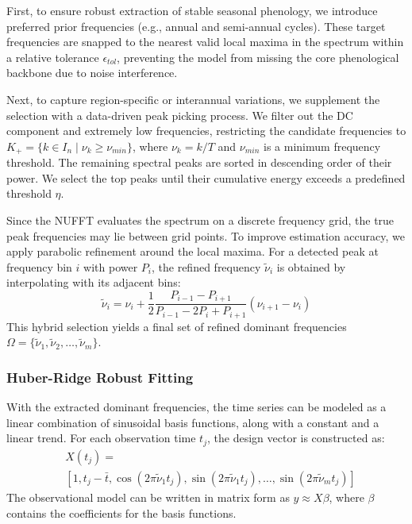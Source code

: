 \documentclass[letterpaper,journal]{IEEEtran}
\begin{document}
First, to ensure robust extraction of stable seasonal phenology, we introduce preferred prior frequencies (e.g., annual and semi-annual cycles). These target frequencies are snapped to the nearest valid local maxima in the spectrum within a relative tolerance $\epsilon_{tol}$, preventing the model from missing the core phenological backbone due to noise interference.

Next, to capture region-specific or interannual variations, we supplement the selection with a data-driven peak picking process. We filter out the DC component and extremely low frequencies, restricting the candidate frequencies to $K_+ = \{k \in I_n \mid \nu_k \ge \nu_{min}\}$, where $\nu_k = k/T$ and $\nu_{min}$ is a minimum frequency threshold. The remaining spectral peaks are sorted in descending order of their power. We select the top peaks until their cumulative energy exceeds a predefined threshold $\eta$.

Since the NUFFT evaluates the spectrum on a discrete frequency grid, the true peak frequencies may lie between grid points. To improve estimation accuracy, we apply parabolic refinement around the local maxima. For a detected peak at frequency bin $i$ with power $P_i$, the refined frequency $\tilde{\nu}_i$ is obtained by interpolating with its adjacent bins:
\begin{equation}
\label{eq:parabolic}
\tilde{\nu}_i = \nu_i + \frac{1}{2}\frac{P_{i-1} - P_{i+1}}{P_{i-1} - 2P_i + P_{i+1}} (\nu_{i+1} - \nu_i)
\end{equation}
This hybrid selection yields a final set of refined dominant frequencies $\Omega = \{\tilde{\nu}_1, \tilde{\nu}_2, \dots, \tilde{\nu}_m\}$.

\subsubsection{Huber-Ridge Robust Fitting}
With the extracted dominant frequencies, the time series can be modeled as a linear combination of sinusoidal basis functions, along with a constant and a linear trend. For each observation time $t_j$, the design vector is constructed as:
\begin{equation}
\label{eq:design}
\begin{split}
&X(t_j) = \\
&\left[1, t_j - \bar{t}, \cos(2\pi\tilde{\nu}_1 t_j), \sin(2\pi\tilde{\nu}_1 t_j), \dots, \sin(2\pi\tilde{\nu}_m t_j)\right]
\end{split}
\end{equation}
The observational model can be written in matrix form as $y \approx X\beta$, where $\beta$ contains the coefficients for the basis functions.
\end{document}
